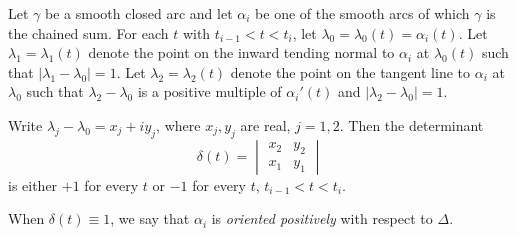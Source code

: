Let $\gamma$ be a smooth closed arc and let $\alpha_i$ be one of the smooth arcs of which $\gamma$ is the chained sum. For each $t$ with $t_{i-1} < t < t_i$, let $\lambda_0 = \lambda_0(t) = \alpha_i(t)$. Let $\lambda_1 = \lambda_1(t)$ denote the point on the inward tending normal to $\alpha_i$ at $\lambda_0(t)$ such that $|\lambda_1 - \lambda_0| = 1$. Let $\lambda_2 = \lambda_2(t)$ denote the point on the tangent line to $\alpha_i$ at $\lambda_0$ such that $\lambda_2 - \lambda_0$ is a positive multiple of $\alpha_i'(t)$ and $|\lambda_2 - \lambda_0| = 1$.

Write $\lambda_j - \lambda_0 = x_j + i y_j$, where $x_j, y_j$ are real, $j = 1, 2$. Then the determinant
$$\delta(t) = \begin{vmatrix} x_2 & y_2 \\ x_1 & y_1 \end{vmatrix}$$
is either $+1$ for every $t$ or $-1$ for every $t$, $t_{i-1} < t < t_i$.

When $\delta(t) \equiv 1$, we say that $\alpha_i$ is \textit{oriented positively} with respect to $\Delta$.
